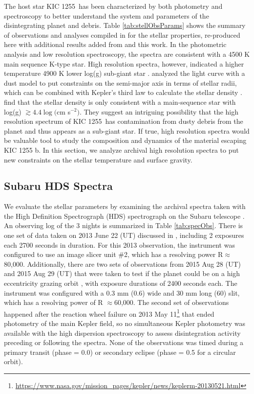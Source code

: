 \documentclass[preprint]{aastex61}
\newcommand{\sha}{KIC 1255 b}
\newcommand{\shStar}{KIC 1255}
\begin{document}
The host star \shStar\ has been characterized by both photometry and spectroscopy to better understand the system and parameters of the disintegrating planet and debris.
Table \ref{tab:stellObsParams} shows the summary of observations and analyses compiled in \citet{vanlieshout2016kic1255} for the stellar properties, re-produced here with additional results added from \citet{morton2016falsePos} and this work.
In the photometric analysis and low resolution spectroscopy, the spectra are consistent with a 4500 K main sequence K-type star.
High resolution spectra, however, indicated a higher temperature 4900 K lower log(g) sub-giant star \citep{kawahara2013starspots}.
\citet{vanlieshout2016kic1255} analyzed the light curve with a dust model to put constraints on the semi-major axis in terms of stellar radii, which can be combined with Kepler's third law to calculate the stellar density \citep{seager2003uniqueSolution}.
\citet{vanlieshout2016kic1255} find that the stellar density is only consistent with a main-sequence star with log(g) $\gtrsim 4.4 \log($cm s$^{-2})$.
They suggest an intriguing possibility that the high resolution spectrum of \shStar\ has contamination from dusty debris from the planet and thus appears as a sub-giant star.
If true, high resolution spectra would be valuable tool to study the composition and dynamics of the material escaping \sha.
In this section, we analyze archival high resolution spectra to put new constraints on the stellar temperature and surface gravity.

\subsection{Subaru HDS Spectra}

We evaluate the stellar parameters by examining the archival spectra taken with the High Definition Spectrograph (HDS) spectrograph on the Subaru telescope \citep{noguchi2002hds}.
An observing log of the 3 nights is summarized in Table \ref{tab:specObs}.
There is one set of data taken on 2013 June 22 (UT) discussed in \citet{kawahara2013starspots}, including 2 exposures each 2700 seconds in duration.
For this 2013 observation, the instrument was configured to use an image slicer unit \#2, which has a resolving power R$\approx$80,000.
Additionally, there are two sets of observations from 2015 Aug 28 (UT) and 2015 Aug 29 (UT) that were taken to test if the planet could be on a high eccentricity grazing orbit \citep{masuda2018rvKIC1255}, with exposure durations of 2400 seconds each.
The instrument was configured with a 0.3 mm (0.6\arcsec) wide and 30 mm long (60\arcsec) slit, which has a resolving power of R $\approx$60,000.
The second set of observations happened after the reaction wheel failure on 2013 May 11\footnote{\url{https://www.nasa.gov/mission_pages/kepler/news/keplerm-20130521.html}} that ended photometry of the main Kepler field, so no simultaneous Kepler photometry was available with the high dispersion spectroscopy to assess disintegration activity preceding or following the spectra.
None of the observations was timed during a primary transit (phase = 0.0) or secondary eclipse (phase = 0.5 for a circular orbit).
\end{document}
